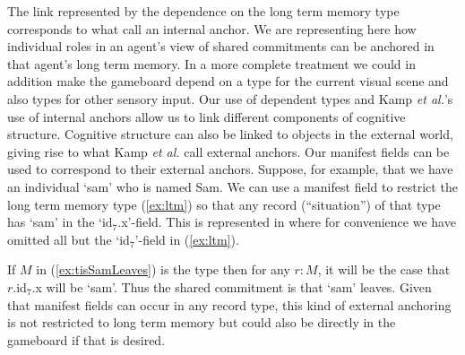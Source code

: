 The link represented by the dependence on the long term memory type corresponds
to what \cite{Kamp1990,KampGenabithReyle2011} call an internal
anchor.  We are representing here how individual roles in an agent's
view of shared commitments can be anchored in that agent's long term
memory.  In a more complete treatment we could in addition make the
gameboard depend on a type for the current visual scene and also types
for other sensory input.  Our use of dependent types and Kamp
\textit{et al.}'s use of internal anchors allow us to link different
components of cognitive structure.  Cognitive structure can also be
linked to objects in the external world, giving rise to what Kamp
\textit{et al.} call external anchors.  Our manifest fields can be
used to correspond to their external anchors.  Suppose, for example,
that we have an individual `sam' who is named Sam.  We can use a
manifest field to restrict the long term memory type (\ref{ex:ltm}) so that any record
(``situation'') of that type has `sam' in the `id$_7$.x'-field.  This
is represented in \nexteg{} where for convenience we have omitted all but the
`id$_7$'-field in (\ref{ex:ltm}).
\begin{ex} 
\end{ex} 
If $M$ in (\ref{ex:tisSamLeaves}) is the type \preveg{} then for any
$r:M$, it will be the case that $r$.id$_7$.x will be `sam'.  Thus the
shared commitment is that `sam' leaves.  Given that manifest fields
can occur in any record type, this kind of external anchoring is not
restricted to long term memory but could also be directly in the
gameboard if that is desired. 


